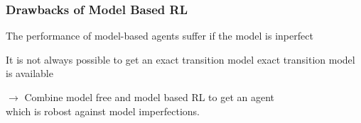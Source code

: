 \begin{frame}
    \frametitle{Drawbacks of Model Based RL}


\begin{PraesentationAufzaehlung}
    \item The performance of model-based agents suffer if the model is inperfect\\
    \item It is not always possible to get an exact transition model
exact transition model is available
\end{PraesentationAufzaehlung}

$\rightarrow$ Combine model free and model based RL to get an agent\\
\hspace{8mm} which is robost against model imperfections.
\end{frame}
\clearpage










